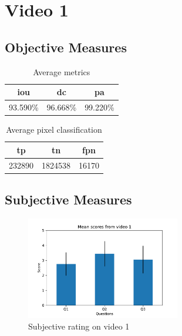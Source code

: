 
\section{Video 1}
\subsection{Objective Measures}

\begin{minipage}[c]{0.475\textwidth}
\begin{table}[H]
    \centering
    \begin{tabular}{||c c c||} 
        \hline
        \acrshort{iou} & \acrshort{dc} & \acrshort{pa} \\ [0.5ex] 
        \hline\hline
        93.590\% & 96.668\% & 99.220\% \\ [1ex] 
        \hline
    \end{tabular}
    \caption{Average metrics}
    \label{tab:metrics_video_1}
\end{table}
\end{minipage}
\begin{minipage}[c]{0.475\textwidth}
\begin{table}[H]
    \centering
    \begin{tabular}{||c c c||} 
        \hline
        \acrshort{tp} & \acrshort{tn} & \acrshort{fpn} \\ [0.5ex] 
        \hline\hline
        232890 & 1824538 & 16170 \\ [1ex] 
        \hline
    \end{tabular}
    \caption{Average pixel classification}
    \label{tab:pixels_video_1}
\end{table}
\end{minipage}

\subsection{Subjective Measures}

\begin{figure}[H]
    \centering
    \includegraphics[width=0.6\textwidth]{img/subjective_measures/analysis/video_1.pdf}
    \caption{Subjective rating on video 1}
    \label{fig:visual_subj_vid1}
\end{figure}

